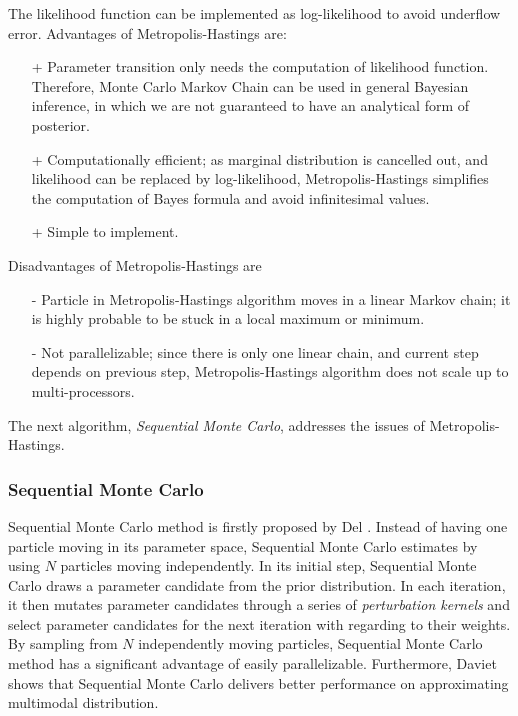 The likelihood function can be implemented as log-likelihood to avoid underflow error.
Advantages of Metropolis-Hastings are:
\begin{itemize}
    \item[+] Parameter transition only needs the computation of likelihood function.
          Therefore, Monte Carlo Markov Chain can be used in general Bayesian inference,
          in which we are not guaranteed to have an analytical form of posterior.
    \item[+] Computationally efficient; as marginal distribution is cancelled out, and likelihood can
          be replaced by log-likelihood, Metropolis-Hastings simplifies the computation of Bayes formula
          and avoid infinitesimal values.
    \item[+] Simple to implement.
\end{itemize}
Disadvantages of Metropolis-Hastings are
\begin{enumerate}
    \item[-] Particle in Metropolis-Hastings algorithm moves in a linear Markov chain; it is highly
          probable to be stuck in a local maximum or minimum.
    \item[-] Not parallelizable; since there is only one linear chain, and current step depends on
          previous step, Metropolis-Hastings algorithm does not scale up to multi-processors.
\end{enumerate}
The next algorithm, \textit{Sequential Monte Carlo}, addresses the issues of Metropolis-Hastings.

\subsubsection{Sequential Monte Carlo}
Sequential Monte Carlo method is firstly proposed by Del \cite{del2006sequential}. Instead of having
one particle moving in its parameter space, Sequential Monte Carlo estimates by using $N$ particles
moving independently. In its initial step, Sequential Monte Carlo draws a parameter candidate from
the prior distribution. In each iteration, it then mutates parameter candidates through a series of
\textit{perturbation kernels} and select parameter candidates for the next iteration with regarding
to their weights. By sampling from $N$ independently moving particles, Sequential Monte Carlo method
has a significant advantage of easily parallelizable. Furthermore, Daviet \cite{daviet2018inference}
shows that Sequential Monte Carlo delivers better performance on approximating multimodal
distribution.

